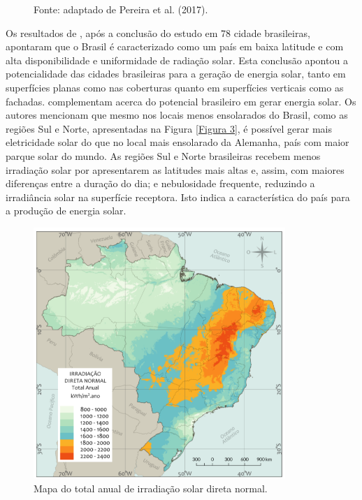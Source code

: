 \begin{onehalfspace}
\begin{figure}[H]
            \begin{flushleft}
                \par \small Fonte: adaptado de Pereira et al. (2017).
            \end{flushleft}
        \label{Figura 2}
    \end{figure}\vspace*{-0.4cm}
\noindent Os resultados de \textcite{Cronemberger2012}, após a conclusão do estudo em 78 cidade brasileiras, apontaram que o Brasil é caracterizado como um país em baixa latitude e com alta disponibilidade e uniformidade de radiação solar. Esta conclusão apontou a potencialidade das cidades brasileiras para a geração de energia solar, tanto em superfícies planas como nas coberturas quanto em superfícies verticais como as fachadas.\vspace{0.3cm} \newline
\textcite{Pereira2017} complementam acerca do potencial brasileiro em gerar energia solar. Os autores mencionam que mesmo nos locais menos ensolarados do Brasil, como as regiões Sul e Norte, apresentadas na Figura \ref{Figura 3}, é possível gerar mais eletricidade solar do que no local mais ensolarado da Alemanha, país com maior parque solar do mundo. As regiões Sul e Norte brasileiras recebem menos irradiação solar por apresentarem as latitudes mais altas e, assim, com maiores diferenças entre a duração do dia; e nebulosidade frequente, reduzindo a irradiância solar na superfície receptora. Isto indica a característica do país para a produção de energia solar.%
    \begin{figure}[ht]
        \centering
        \caption{\small Mapa do total anual de irradiação solar direta normal.}
        \includegraphics[width=0.85\textwidth]{figures/fig4-mapa2.png}

\end{figure}
\end{onehalfspace}
